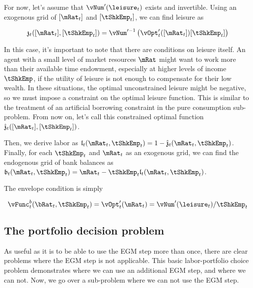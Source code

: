 \documentclass[\econtexRoot/EGMN]{subfiles}
\begin{document}
For now, let's assume that $\vNum'(\leisure_{t})$ exists and invertible. Using
an exogenous grid of $[\mRat_{t}]$ and $[\tShkEmp_{t}]$, we can find leisure as

\providecommand{\zEndFunc}{\ensuremath{\mathfrak{z}}}

\begin{equation}
  \zEndFunc_{t}([\mRat_{t}], [\tShkEmp_{t}]) = \vNum'^{-1}\left(
  \vOpt_{t}'([\mRat_{t}]) [\tShkEmp_{t}] \right)
\end{equation}

In this case, it's important to note that there are conditions on leisure itself. An agent with a small level of market resources $\mRat$ might want to work more than their available time endowment, especially at higher levels of income $\tShkEmp$, if the utility of leisure is not enough to compensate for their low wealth. In these situations, the optimal unconstrained leisure might be negative, so we must impose a constraint on the optimal leisure function. This is similar to the treatment of an artificial borrowing constraint in the pure consumption sub-problem. From now on, let's call this constrained optimal function $\hat{\zEndFunc}_{t}([\mRat_{t}], [\tShkEmp_{t}])$.

\providecommand{\lEndFunc}{\ensuremath{\mathfrak{l}}}
\providecommand{\bEndFunc}{\ensuremath{\mathfrak{b}}}

Then, we derive labor as $\lEndFunc_{t}(\mRat_{t}, \tShkEmp_{t}) = 1 -
  \hat{\zEndFunc}_{t}(\mRat_{t}, \tShkEmp_{t})$. Finally, for each
$\tShkEmp_{t}$ and
$\mRat_{t}$ as an exogenous grid, we can find the endogenous grid of bank
balances as $\bEndFunc_{t}(\mRat_{t}, \tShkEmp_{t}) = \mRat_{t} -
  \tShkEmp_{t}\lEndFunc_{t}(\mRat_{t}, \tShkEmp_{t})$.

The envelope condition is simply

\begin{equation}
  \vFunc_{t}^{b}(\bRat_{t}, \tShkEmp_{t}) = \vOpt_{t}'(\mRat_{t}) =
  \vNum'(\leisure_{t})/\tShkEmp_{t}
\end{equation}

\subsection{The portfolio decision problem}

As useful as it is to be able to use the EGM step more than once, there are clear problems where the EGM step is not applicable. This basic labor-portfolio choice problem demonstrates where we can use an additional EGM step, and where we can not. Now, we go over a sub-problem where we can not use the EGM step.
\end{document}
